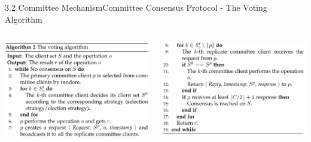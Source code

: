 \documentclass{sintefbeamer}
\theoremstyle{definition}
\begin{document}
\begin{frame}{3.2 Committee Mechanism}{Committee Consensus Protocol - The Voting Algorithm}
\begin{columns}
\begin{column}{0.45\textwidth}
\includegraphics[width=1\textwidth]{images/algo_vote1}
\end{column}
\begin{column}{0.55\textwidth}
\includegraphics[width=1\textwidth]{images/algo_vote2}
\end{column}
\end{columns}
\end{frame}
\end{document}
